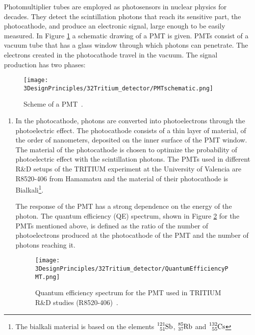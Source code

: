Photomultiplier tubes are employed as photosensors in nuclear physics for decades. They detect the scintillation photons that reach its sensitive part, the photocathode, and produce an electronic signal, large enough to be easily measured. In Figure \ref{fig:SchemePMT} a schematic drawing of a PMT is given. PMTs consist of a vacuum tube that has a glass window through which photons can penetrate. The electrons created in the photocathode travel in the vacuum. The signal production has two phases:

\begin{figure}[htbp]
\centering
\texttt{[image: 3DesignPrinciples/32Tritium\_detector/PMTschematic.png]}
\caption{Scheme of a PMT\label{fig:SchemePMT}~\cite{Knoll}.}
\end{figure}

\begin{enumerate}
\item{} In the photocathode, photons are converted into photoelectrons through the photoelectric effect. The photocathode consists of a thin layer of material, of the order of nanometers, deposited on the inner surface of the PMT window. The material of the photocathode is chosen to optimize the probability of photoelectric effect with the scintillation photons. The PMTs used in different R\&D setups of the TRITIUM experiment at the University of Valencia are R8520-406 from Hamamatsu \cite{DataSheetPMTs} and the material of their photocathode is Bialkali\footnote{The bialkali material is based on the elements $\ce{^{121}_{51}Sb}$, $\ce{^{85}_{37}Rb}$ and $\ce{^{132}_{55}Cs}$}.


The response of the PMT has a strong dependence on the energy of the photon. The quantum efficiency (QE)  spectrum, shown in Figure \ref{fig:QuantumEfficiencyPMT} for the PMTs mentioned above, is defined as the ratio of the number of photoelectrons produced at the photocathode of the PMT and the number of photons reaching it.

\begin{figure}[htbp]
\centering
\texttt{[image: 3DesignPrinciples/32Tritium\_detector/QuantumEfficiencyPMT.png]}
\caption{Quantum efficiency spectrum for the PMT used in TRITIUM R\&D studies (R8520-406)\label{fig:QuantumEfficiencyPMT}~\cite{DataSheetPMTs}.}
\end{figure}


\end{enumerate}
